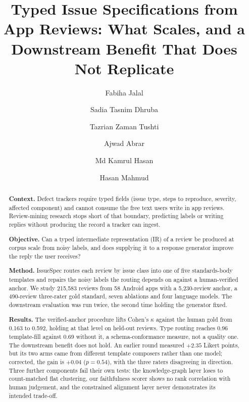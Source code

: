 \documentclass[preprint,12pt]{elsarticle}
\begin{document}
\begin{frontmatter}

\title{Typed Issue Specifications from App Reviews: What Scales, and a Downstream Benefit That Does Not Replicate}

\author[inst1]{Fabiha Jalal}
\author[inst1]{Sadia Tasnim Dhruba}
\author[inst1]{Tazrian Zaman Tushti}
\author[inst2]{Ajwad Abrar}
\author[inst2]{Md Kamrul Hasan}
\author[inst2]{Hasan Mahmud}



\begin{abstract}
\textbf{Context.} Defect trackers require typed fields (issue type, steps to reproduce, severity,
affected component) and cannot consume the free text users write in app reviews. Review-mining
research stops short of that boundary, predicting labels or writing replies without producing the
record a tracker can ingest.

\textbf{Objective.} Can a typed intermediate representation (IR) of a review be produced at
corpus scale from noisy labels, and does supplying it to a response generator improve the reply
the user receives?

\textbf{Method.} IssueSpec routes each review by issue class into one of five standards-body
templates and repairs the noisy labels the routing depends on against a human-verified anchor. We
study 215,583 reviews from 58 Android apps with a 5,230-review anchor, a 490-review three-rater
gold standard, seven ablations and four language models. The downstream evaluation was run twice,
the second time holding the generator fixed.

\textbf{Results.} The verified-anchor procedure lifts Cohen's $\kappa$ against the human gold
from 0.163 to 0.592, holding at that level on held-out reviews. Type routing
reaches 0.96 template-fill against 0.69 without it, a schema-conformance measure, not a
quality one. The downstream benefit does not hold. An earlier round measured $+2.35$ Likert
points, but its two arms came from different template composers rather than one model; corrected,
the gain is $+0.04$ ($p = 0.54$), with the three raters disagreeing in direction. Three further
components fail their own tests: the knowledge-graph layer loses to count-matched flat clustering,
our faithfulness scorer shows no rank correlation with human judgement, and the constrained
alignment layer never demonstrates its intended trade-off.


\end{abstract}
\end{frontmatter}
\end{document}
